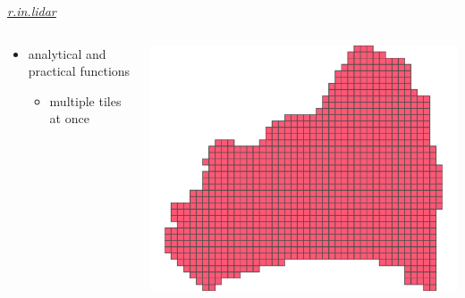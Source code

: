 \documentclass[xcolor={dvipsnames,usenames},beamer,aspectratio=169]{beamer}
\newcommand{\gmodule}[1]{\href{http://grass.osgeo.org/grass71/manuals/#1.html}{\emph{#1}}}
\begin{document}
\begin{frame}{\gmodule{r.in.lidar}}

\begin{columns}
\begin{column}{0.45\textwidth}

 \begin{itemize}
  \item analytical and practical functions
  \begin{itemize}
  \item multiple tiles at once
  \end{itemize}
\end{itemize}

\end{column}
\begin{column}{0.54\textwidth}

\begin{center}
  \includegraphics[width=\textwidth]{features/tiles}
\end{center}

\end{column}
\end{columns}

\end{frame}
\end{document}
